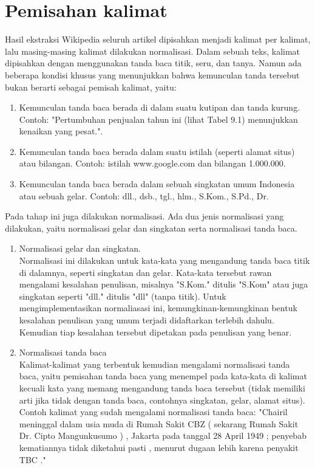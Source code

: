 \section{Pemisahan kalimat}
Hasil ekstraksi Wikipedia seluruh artikel dipisahkan menjadi kalimat per kalimat, lalu masing-masing kalimat dilakukan normalisasi. Dalam sebuah teks, kalimat dipisahkan dengan menggunakan tanda baca titik, seru, dan tanya. Namun ada beberapa kondisi khusus yang menunjukkan bahwa kemunculan tanda tersebut bukan berarti sebagai pemisah kalimat, yaitu:
\begin{enumerate}
	\item Kemunculan tanda baca berada di dalam suatu kutipan dan  tanda kurung. Contoh: "Pertumbuhan penjualan tahun ini (lihat Tabel 9.1) menunjukkan kenaikan yang pesat.".
	
	\item Kemunculan tanda baca berada dalam suatu istilah (seperti alamat situs) atau bilangan. Contoh: istilah www.google.com dan bilangan 1.000.000.
	
	\item Kemunculan tanda baca berada dalam sebuah singkatan umum Indonesia atau sebuah gelar. Contoh: dll., dsb., tgl., hlm., S.Kom., S.Pd., Dr.
\end{enumerate}
Pada tahap ini juga dilakukan normalisasi. Ada dua jenis normalisasi yang dilakukan, yaitu normalisasi gelar dan singkatan serta normalisasi tanda baca. 
\begin{enumerate}
	\item Normalisasi gelar dan singkatan. \\Normalisasi ini dilakukan untuk kata-kata yang mengandung tanda baca titik di dalamnya, seperti singkatan dan gelar. Kata-kata tersebut rawan mengalami kesalahan penulisan, misalnya "S.Kom." ditulis "S.Kom" atau juga singkatan seperti "dll." ditulis "dll" (tanpa titik). Untuk mengimplementasikan normaliasasi ini, kemungkinan-kemungkinan bentuk kesalahan penulisan yang umum terjadi didaftarkan terlebih dahulu. Kemudian tiap kesalahan tersebut dipetakan pada penulisan yang benar.
	
	\item Normalisasi tanda baca \\Kalimat-kalimat yang terbentuk kemudian mengalami normalisasi tanda baca, yaitu pemisahan tanda baca yang menempel pada kata-kata di kalimat kecuali kata yang memang mengandung tanda baca tersebut (tidak memiliki arti jika tidak dengan tanda baca, contohnya singkatan, gelar, alamat situs). Contoh kalimat yang sudah mengalami normalisasi tanda baca:
	"Chairil meninggal dalam usia muda di Rumah Sakit CBZ ( sekarang Rumah Sakit Dr. Cipto Mangunkusumo ) , Jakarta pada tanggal 28 April 1949 ; penyebab kematiannya tidak diketahui pasti , menurut dugaan lebih karena penyakit TBC ."
\end{enumerate}
